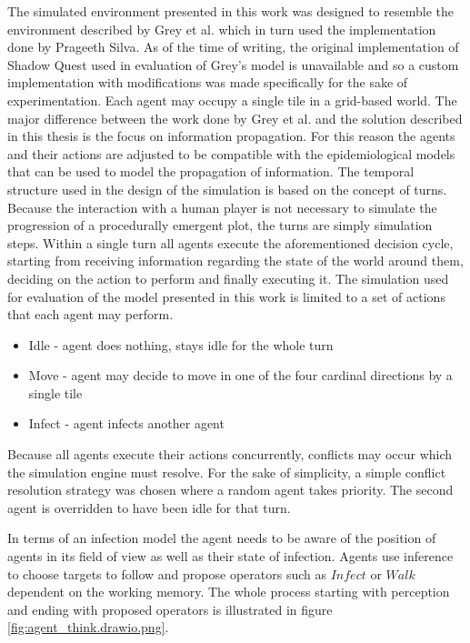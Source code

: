 \label{chapter:chapter2}

The simulated environment presented in this work was designed to resemble the environment described by Grey et al.\cite{grey2011procedural} which in turn used the implementation done by Prageeth Silva\cite{silva2010shadow}.
As of the time of writing, the original implementation of Shadow Quest used in evaluation of Grey's model is unavailable and so a custom implementation with modifications was made specifically for the sake of experimentation.
Each agent may occupy a single tile in a grid-based world.
The major difference between the work done by Grey et al. and the solution described in this thesis is the focus on information propagation.
For this reason the agents and their actions are adjusted to be compatible with the epidemiological models that can be used to model the propagation of information.
The temporal structure used in the design of the simulation is based on the concept of turns.
Because the interaction with a human player is not necessary to simulate the progression of a procedurally emergent plot, the turns are simply simulation steps.
Within a single turn all agents execute the aforementioned decision cycle, starting from receiving information regarding the state of the world around them, deciding on the action to perform and finally executing it.
The simulation used for evaluation of the model presented in this work is limited to a set of actions that each agent may perform.

\begin{itemize}
    \item Idle - agent does nothing, stays idle for the whole turn
    \item Move - agent may decide to move in one of the four cardinal directions by a single tile
    \item Infect - agent infects another agent
\end{itemize}

Because all agents execute their actions concurrently, conflicts may occur which the simulation engine must resolve.
For the sake of simplicity, a simple conflict resolution strategy was chosen where a random agent takes priority.
The second agent is overridden to have been idle for that turn.

In terms of an infection model the agent needs to be aware of the position of agents in its field of view as well as their state of infection.
Agents use inference to choose targets to follow and propose operators such as $Infect$ or $Walk$ dependent on the working memory.
The whole process starting with perception and ending with proposed operators is illustrated in figure \ref{fig:agent_think.drawio.png}.

